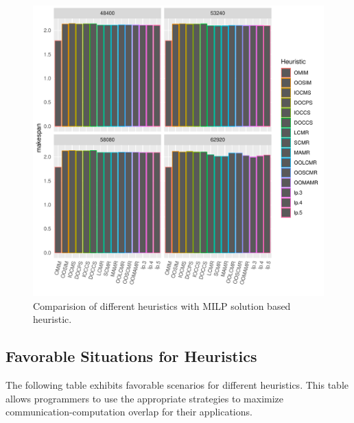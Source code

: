 \documentclass[sigconf]{acmart}
\begin{document}
{\begin{figure}[htb]
	\includegraphics[scale=0.5]{./results/makespan_with_lp.pdf}
	\caption{Comparision of different heuristics with MILP solution based heuristic.}
	\label{fig:iterativeLpSolution}
\end{figure}
	
	\subsection{Favorable Situations for Heuristics}
	\noindent The following table exhibits favorable scenarios for different heuristics. This table allows programmers to use the appropriate strategies to maximize communication-computation overlap for their applications.
	
}
\end{document}
